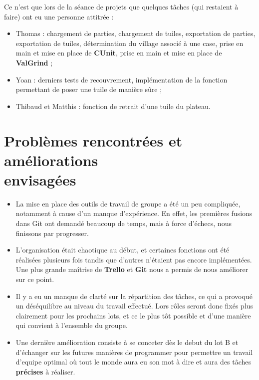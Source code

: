 \documentclass[12pt,a4paper]{article}
\begin{document}
Ce n'est que lors de la séance de projets que quelques tâches (qui restaient à faire) ont eu une personne attitrée :

\begin{itemize}
	\item Thomas : chargement de parties, chargement de tuiles, exportation de parties, exportation de tuiles, détermination du village associé à une case, prise en main et mise en place de \textbf{CUnit}, prise en main et mise en place de \textbf{ValGrind} ;
    \item Yoan : derniers tests de recouvrement, implémentation de la fonction permettant de poser une tuile de manière sûre ;
    \item Thibaud et Matthis : fonction de retrait d'une tuile du plateau.
\end{itemize}
    
\pagebreak

\section{Problèmes rencontrées et améliorations \\envisagées}

\begin{itemize}
\item La mise en place des outils de travail de groupe a été un peu compliquée, notamment à cause d'un manque d'expérience. En effet, les premières fusions dans Git ont demandé beaucoup de temps, mais à force d'échecs, nous finissons par progresser.

\item L'organisation était chaotique au début, et certaines fonctions ont été réalisées plusieurs fois tandis que d'autres n'étaient pas encore implémentées. Une plus grande maîtrise de \textbf{Trello} et \textbf{Git} nous a permis de nous améliorer sur ce point.

\item Il y a eu un manque de clarté sur la répartition des tâches, ce qui a provoqué un déséquilibre au niveau du travail effectué. Lors rôles seront donc fixés plus clairement pour les prochains lots, et ce le plus tôt possible et d'une manière qui convient à l'ensemble du groupe. 

\item Une dernière amélioration consiste à se conceter dès le debut du lot B et d'échanger sur les futures manières de programmer pour permettre un travail d'equipe optimal où tout le monde aura eu son mot à dire et aura des tâches \textbf{précises} à réaliser.
\end{itemize}
\end{document}
